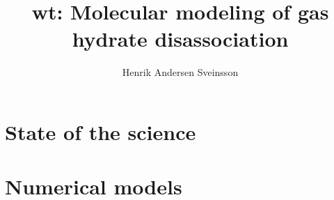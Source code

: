 \documentclass[twoside, english, a4paper]{uiofysmaster}
\title{wt: Molecular modeling of gas hydrate disassociation}
\author{Henrik Andersen Sveinsson}
\begin{document}
\maketitle



\tableofcontents



\part{State of the science}


\part{Numerical models}


\part{}


\end{document}

